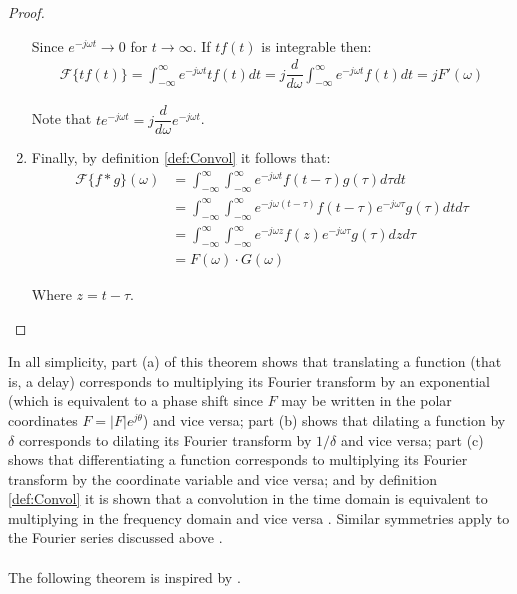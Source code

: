 \begin{proof}
\begin{enumerate}[label=(\alph*)]
Since $e^{-j\omega t} \to 0$ for $t \to \infty$. If $tf(t)$ is integrable then:
\begin{align*}
\mathcal{F}\{tf(t)\} = \int_{-\infty}^\infty e^{-j \omega t} t f(t) dt = j \dfrac{d}{d\omega} \int_{-\infty}^\infty e^{-j \omega t} f(t) dt = j F'(\omega)
\end{align*}

Note that $t e^{-j \omega t} = j \dfrac{d}{d\omega} e^{-j\omega t}$.

\item Finally, by definition \ref{def:Convol} it follows that:
\begin{align*}
\mathcal{F}\{f*g\}(\omega) &= \int_{-\infty}^\infty \int_{-\infty}^\infty e^{-j \omega t} f(t - \tau) g(\tau) d\tau dt \\
&= \int_{-\infty}^\infty \int_{-\infty}^\infty e^{-j\omega(t-\tau)} f(t-\tau) e^{-j\omega \tau} g(\tau) dt d\tau \\
&= \int_{-\infty}^\infty \int_{-\infty}^\infty e^{-j\omega z} f(z) e^{-j\omega \tau} g(\tau) dz d\tau \\
&= F(\omega) \cdot G(\omega)
\end{align*}

Where $z = t - \tau$.
\end{enumerate}
\end{proof}

\noindent
In all simplicity, part (a) of this theorem shows that translating a function (that is, a delay) corresponds to multiplying its Fourier transform by an exponential (which is equivalent to a phase shift since $F$ may be written in the polar coordinates $F = |F|e^{j\theta}$) and vice versa; part (b) shows that dilating a function by $\delta$ corresponds to dilating its Fourier transform by $1/\delta$ and vice versa; part (c) shows that differentiating a function corresponds to multiplying its Fourier transform by the coordinate variable and vice versa; and by definition \ref{def:Convol} it is shown that a convolution in the time domain is equivalent to multiplying in the frequency domain and vice versa \cite{page 215, FAA}. Similar symmetries apply to the Fourier series discussed above \cite{page 60, DTSP}.
\\ \\
The following theorem is inspired by \cite{page 77, FAA}. 

